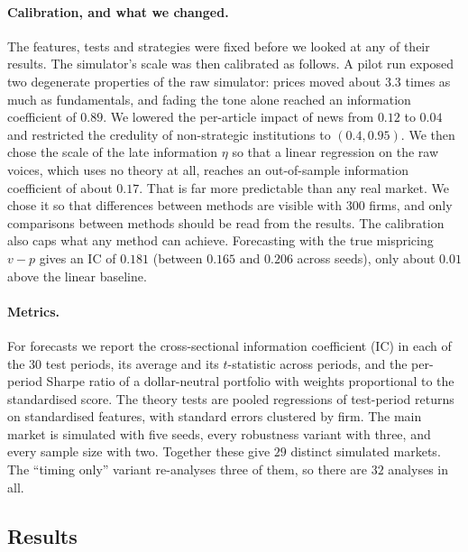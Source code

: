 \documentclass[11pt,a4paper]{article}
\theoremstyle{plain}
\theoremstyle{definition}
\theoremstyle{remark}
\begin{document}
\paragraph{Calibration, and what we changed.} The features, tests and strategies were fixed before we looked at any of their results. The simulator's scale was then calibrated as follows. A pilot run exposed two degenerate properties of the raw simulator: prices moved about $3.3$ times as much as fundamentals, and fading the tone alone reached an information coefficient of $0.89$. We lowered the per-article impact of news from $0.12$ to $0.04$ and restricted the credulity of non-strategic institutions to $(0.4,0.95)$. We then chose the scale of the late information $\eta$ so that a linear regression on the raw voices, which uses no theory at all, reaches an out-of-sample information coefficient of about $0.17$. That is far more predictable than any real market. We chose it so that differences between methods are visible with $300$ firms, and only comparisons between methods should be read from the results. The calibration also caps what any method can achieve. Forecasting with the true mispricing $v-p$ gives an IC of $0.181$ (between $0.165$ and $0.206$ across seeds), only about $0.01$ above the linear baseline.

\paragraph{Metrics.} For forecasts we report the cross-sectional information coefficient (IC) in each of the $30$ test periods, its average and its $t$-statistic across periods, and the per-period Sharpe ratio of a dollar-neutral portfolio with weights proportional to the standardised score. The theory tests are pooled regressions of test-period returns on standardised features, with standard errors clustered by firm. The main market is simulated with five seeds, every robustness variant with three, and every sample size with two. Together these give $29$ distinct simulated markets. The ``timing only'' variant re-analyses three of them, so there are $32$ analyses in all.

\subsection{Results}
\end{document}

